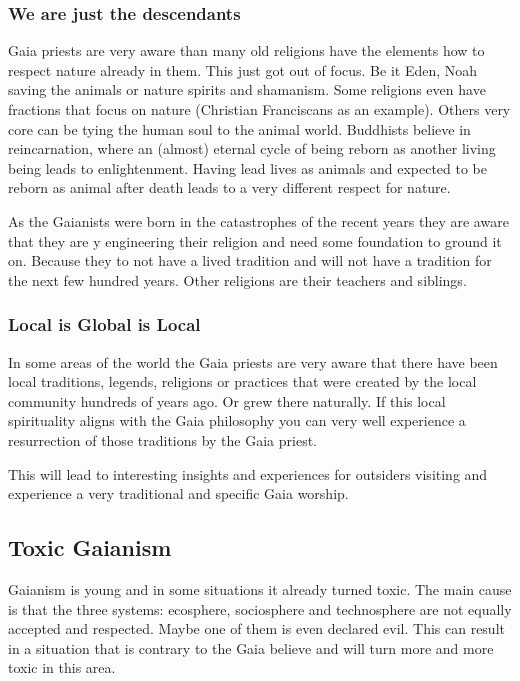 \subsubsection{We are just the descendants}

Gaia priests are very aware than many old religions have the elements how to respect nature already in them. This just got out of focus. Be it Eden, Noah saving the animals or nature spirits and shamanism. Some religions even have fractions that focus on nature (Christian Franciscans as an example).
Others very core can be tying the human soul to the animal world. Buddhists believe in reincarnation, where an (almost) eternal cycle of being reborn as another living being leads to enlightenment. Having lead lives as animals and expected to be reborn as animal after death leads to a very different respect for nature.

As the Gaianists were born in the catastrophes of the recent years they are aware that they are y engineering their religion and need some foundation to ground it on. Because they to not have a lived tradition and will not have a tradition for the next few hundred years. Other religions are their teachers and siblings.

\subsubsection{Local is Global is Local}

In some areas of the world the Gaia priests are very aware that there have been local traditions, legends, religions or practices that were created by the local community hundreds of years ago. Or grew there naturally. If this local spirituality aligns with the Gaia philosophy you can very well experience a resurrection of those traditions by the Gaia priest.

This will lead to interesting insights and experiences for outsiders visiting and experience a very traditional and specific Gaia worship.

\subsection{Toxic Gaianism}

Gaianism is young and in some situations it already turned toxic. The main cause is that the three systems: ecosphere, sociosphere and technosphere are not equally accepted and respected. Maybe one of them is even declared evil. This can result in a situation that is contrary to the Gaia believe and will turn more and more toxic in this area.

